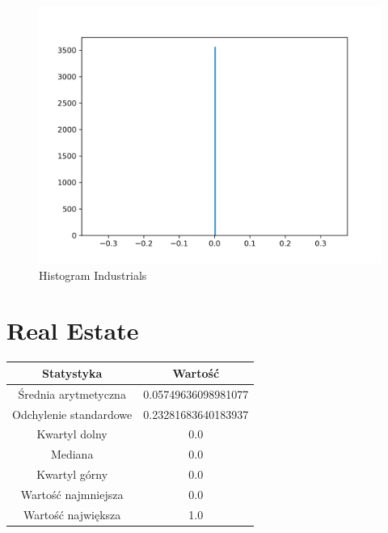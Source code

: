 \documentclass{article}
\begin{document}
\begin{figure}[h!]
    \includegraphics[width=\linewidth]{variables/Industrials.png}
    \caption{Histogram Industrials }
\end{figure}\section{ Real Estate }

\begin{center}
    \begin{tabular}{|c | c|} 
    \hline
    Statystyka & Wartość \\
    \hline\hline
    Średnia arytmetyczna & 0.05749636098981077 \\ 
    \hline
    Odchylenie standardowe & 0.23281683640183937 \\
    \hline
    Kwartyl dolny & 0.0 \\
    \hline
    Mediana & 0.0 \\
    \hline
    Kwartyl górny & 0.0 \\
    \hline
    Wartość najmniejsza & 0.0 \\
    \hline
    Wartość największa & 1.0 \\
    \hline
   \end{tabular}
\end{center}
\end{document}
